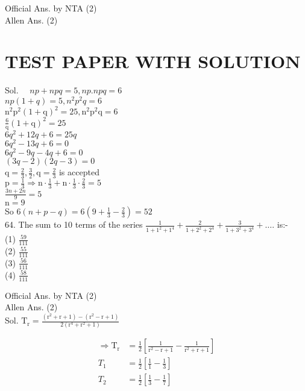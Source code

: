 \documentclass[10pt]{article}
\begin{document}
Official Ans. by NTA (2)\\
Allen Ans. (2)

\section*{TEST PAPER WITH SOLUTION}
Sol. \(\quad n p+n p q=5, n p . n p q=6\)\\
\(n p(1+q)=5, n^{2} p^{2} q=6\)\\
\(\mathrm{n}^{2} \mathrm{p}^{2}(1+\mathrm{q})^{2}=25, \mathrm{n}^{2} \mathrm{p}^{2} \mathrm{q}=6\)\\
\(\frac{6}{\mathrm{q}}(1+\mathrm{q})^{2}=25\)\\
\(6 q^{2}+12 q+6=25 q\)\\
\(6 q^{2}-13 q+6=0\)\\
\(6 q^{2}-9 q-4 q+6=0\)\\
\((3 q-2)(2 q-3)=0\)\\
\(\mathrm{q}=\frac{2}{3}, \frac{3}{2}, \mathrm{q}=\frac{2}{3}\) is accepted\\
\(\mathrm{p}=\frac{1}{3} \Rightarrow \mathrm{n} \cdot \frac{1}{3}+\mathrm{n} \cdot \frac{1}{3} \cdot \frac{2}{3}=5\)\\
\(\frac{3 n+2 n}{9}=5\)\\
\(\mathrm{n}=9\)\\
So \(6(n+p-q)=6\left(9+\frac{1}{3}-\frac{2}{3}\right)=52\)\\
64. The sum to 10 terms of the series \(\frac{1}{1+1^{2}+1^{4}}+\frac{2}{1+2^{2}+2^{4}}+\frac{3}{1+3^{2}+3^{4}}+\ldots\). is:-\\
(1) \(\frac{59}{111}\)\\
(2) \(\frac{55}{111}\)\\
(3) \(\frac{56}{111}\)\\
(4) \(\frac{58}{111}\)

Official Ans. by NTA (2)\\
Allen Ans. (2)\\
Sol. \(\mathrm{T}_{\mathrm{r}}=\frac{\left(\mathrm{r}^{2}+\mathrm{r}+1\right)-\left(\mathrm{r}^{2}-\mathrm{r}+1\right)}{2\left(\mathrm{r}^{4}+\mathrm{r}^{2}+1\right)}\)

\[
\begin{aligned}
\Rightarrow \mathrm{T}_{\mathrm{r}} & =\frac{1}{2}\left[\frac{1}{\mathrm{r}^{2}-\mathrm{r}+1}-\frac{1}{\mathrm{r}^{2}+\mathrm{r}+1}\right] \\
T_{1} & =\frac{1}{2}\left[\frac{1}{1}-\frac{1}{3}\right] \\
T_{2} & =\frac{1}{2}\left[\frac{1}{3}-\frac{1}{7}\right]
\end{aligned}
\]
\end{document}
